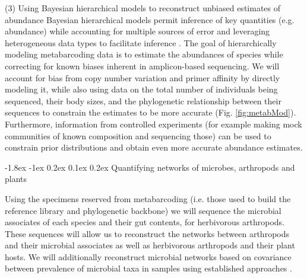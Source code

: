 \documentclass[11pt]{article}
\makeatletter
\renewcommand\subsection{\@startsection{subsection}{1}{\z@}%
                                  {-1.8ex \@plus -1ex \@minus 0.2ex}%
                                  {0.1ex \@plus 0.2ex}%
                                  {\normalfont\large\bfseries}}
\renewcommand{\paragraph}{\@startsection{paragraph}{4}{\z@}
  {1ex \@plus 1ex \@minus .2ex}{-1em}
  {\normalfont\normalsize\it}
}
\makeatother
\begin{document}
\paragraph{(3) Using Bayesian hierarchical models to reconstruct
  unbiased estimates of abundance}
Bayesian hierarchical models permit inference of key quantities
(e.g. abundance) while accounting for multiple sources of error and
leveraging heterogeneous data types to facilitate inference
\citep{royleDorazio}.  The goal of hierarchically modeling
metabarcoding data is to estimate the abundances of species while
correcting for known biases inherent in amplicon-based sequencing.  We
will account for bias from copy number variation \citep{} and primer
affinity \citep{} by directly modeling it, while also using data on
the total number of individuals being sequenced, their body sizes, and
the phylogenetic relationship between their sequences to constrain the
estimates to be more accurate (Fig. \ref{fig:metabMod}).  Furthermore,
information from controlled experiments (for example making mock
communities of known composition and sequencing those) can be used to
constrain prior distributions and obtain even more accurate abundance
estimates.


\subsection{Quantifying networks of microbes, arthropods and plants}

Using the specimens reserved from metabarcoding (i.e. those used to
build the reference library and phylogenetic backbone) we will
sequence the microbial associates of each species and their gut
contents, for herbivorous arthropods.  These sequences will allow us
to reconstruct the networks between arthropods and their microbial
associates as well as herbivorous arthropods and their plant hosts.
We will additionally reconstruct microbial networks based on
covariance between prevalence of microbial taxa in samples using
established approaches \citep{kurtz2015}.





\vbox{}
\end{document}
